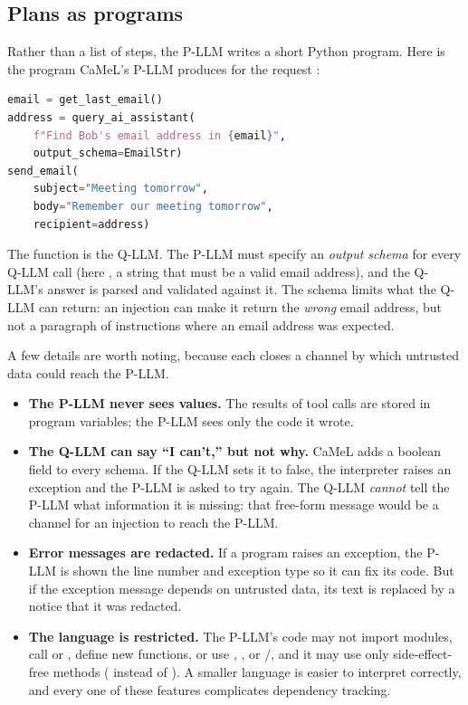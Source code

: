 \subsection{Plans as programs}

Rather than a list of steps, the P-LLM writes a short Python program.
Here is the program CaMeL's P-LLM produces for the request
:
\begin{lstlisting}[language=python,style=camel]
email = get_last_email()
address = query_ai_assistant(
    f"Find Bob's email address in {email}",
    output_schema=EmailStr)
send_email(
    subject="Meeting tomorrow",
    body="Remember our meeting tomorrow",
    recipient=address)
\end{lstlisting}
The function  is the Q-LLM.
The P-LLM must specify an \emph{output schema} for every Q-LLM call (here
, a string that must be a valid email address), and the
Q-LLM's answer is parsed and validated against it.
The schema limits what the Q-LLM can return: an injection can make it
return the \emph{wrong} email address, but not a paragraph of
instructions where an email address was expected.

A few details are worth noting, because each closes a channel by which
untrusted data could reach the P-LLM.
\begin{itemize}
\item \textbf{The P-LLM never sees values.} The results of tool calls
  are stored in program variables; the P-LLM sees only the code it wrote.
\item \textbf{The Q-LLM can say ``I can't,'' but not why.} CaMeL adds a
  boolean field  to every schema. If the
  Q-LLM sets it to false, the interpreter raises an exception and the
  P-LLM is asked to try again. The Q-LLM \emph{cannot} tell the P-LLM
  what information it is missing: that free-form message would be a
  channel for an injection to reach the P-LLM.
\item \textbf{Error messages are redacted.} If a program raises an
  exception, the P-LLM is shown the line number and exception type so it
  can fix its code. But if the exception message depends on untrusted
  data, its text is replaced by a notice that it was redacted.
\item \textbf{The language is restricted.} The P-LLM's code may not
  import modules, call  or , define new functions,
  or use , , or /, and it may
  use only side-effect-free methods (\ttt{[*l, x]} instead of
  ). A smaller language is easier to interpret
  correctly, and every one of these features complicates dependency
  tracking.
\end{itemize}

